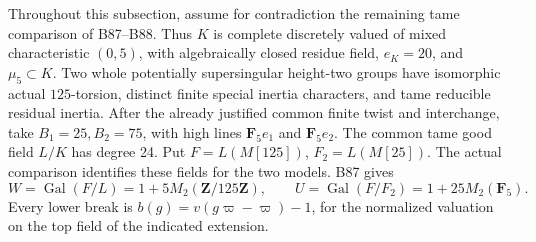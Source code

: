Throughout this subsection, assume for contradiction the remaining tame
comparison of B87--B88. Thus \(K\) is complete discretely valued of mixed
characteristic \((0,5)\), with algebraically closed residue field,
\(e_K=20\), and \(\mu_5\subset K\). Two whole potentially supersingular
height-two groups have isomorphic actual \(125\)-torsion, distinct finite
special inertia characters, and tame reducible residual inertia.
After the already justified common finite twist and interchange, take
\(B_1=25,B_2=75\), with high lines \(\mathbf F_5e_1\) and
\(\mathbf F_5e_2\). The common tame good field \(L/K\) has degree 24.
Put \(F=L(M[125])\), \(F_2=L(M[25])\). The actual comparison identifies
these fields for the two models. B87 gives
\[
 W=\operatorname{Gal}(F/L)=1+5M_2(\mathbf Z/125\mathbf Z),
 \qquad U=\operatorname{Gal}(F/F_2)=1+25M_2(\mathbf F_5).
 \tag{B-RD90.1}
\]
Every lower break is \(b(g)=v(g\varpi-\varpi)-1\), for the normalized
valuation on the top field of the indicated extension.

